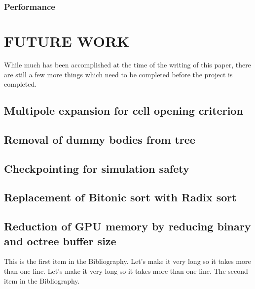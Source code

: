 \documentclass{thesis}
\begin{document}
\subsection{Performance}

\chapter{FUTURE WORK}
While much has been accomplished at the time of the writing of this paper, there are still a few more things which need to be completed before the project is completed.

\section{Multipole expansion for cell opening criterion}
\section{Removal of dummy bodies from tree}
\section{Checkpointing for simulation safety}
\section{Replacement of Bitonic sort with Radix sort}
\section{Reduction of GPU memory by reducing binary and octree buffer size}


\begin{singlespace}
\begin{thebibliography}{99}
 This is the first item in the Bibliography.
Let's make it very long so it takes more than one line.
Let's make it very long so it takes more than one line.
 The second item in the Bibliography.
\end{thebibliography}
\end{singlespace}
\end{document}
